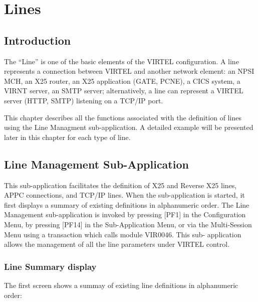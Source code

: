 \documentclass[letterpaper,10pt,english]{sphinxmanual}
\begin{document}
\chapter{Lines}
\label{\detokenize{connectivity_guide:lines}}

\section{Introduction}
\label{\detokenize{connectivity_guide:introduction}}
The “Line” is one of the basic elements of the VIRTEL configuration. A line represents a connection between VIRTEL and another network element: an NPSI MCH, an X25 router, an X25 application (GATE, PCNE), a CICS system, a VIRNT server, an SMTP server; alternatively, a line can represent a VIRTEL server (HTTP, SMTP) listening on a TCP/IP port.

This chapter describes all the functions associated with the definition of lines using the Line Managment sub-application. A detailed example will be presented later in
this chapter for each type of line.


\section{Line Management Sub-Application}
\label{\detokenize{connectivity_guide:line-management-sub-application}}
This sub-application facilitates the definition of X25 and Reverse X25 lines, APPC connections, and TCP/IP lines. When the sub-application is started, it first displays a summary of existing definitions in alphanumeric order. The Line Management sub-application is invoked by pressing {[}PF1{]} in the Configuration Menu, by pressing {[}PF14{]} in the Sub-Application Menu, or via the Multi-Session Menu using a transaction which calls module VIR0046. This sub- application allows the management of all the line parameters under VIRTEL control.


\subsection{Line Summary display}
\label{\detokenize{connectivity_guide:line-summary-display}}
The first screen shows a summay of existing line definitions in alphanumeric order:


\end{document}
